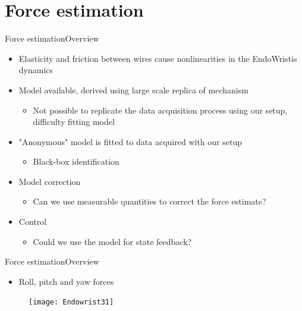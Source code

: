 \section{Force estimation}

\begin{frame}{Force estimation}{Overview}
\begin{itemize}
\item Elasticity and friction between wires cause nonlinearities in the EndoWristis dynamics
\item Model available, derived using large scale replica of mechanism
	\begin{itemize}
		\item Not possible to replicate the data acquisition process using our setup, difficulty fitting model
	\end{itemize}
	
\item "Anonymous" model is fitted to data acquired with our setup
	\begin{itemize}
		\item Black-box identification
	\end{itemize}

\item Model correction
	\begin{itemize}
		\item Can we use measurable quantities to correct the force estimate?
	\end{itemize}

\item Control
	\begin{itemize}
		\item Could we use the model for state feedback?
	\end{itemize}
\end{itemize}
\end{frame}

\begin{frame}{Force estimation}{Overview}
\begin{itemize}
  	\item Roll, pitch and yaw forces
\end{itemize}
 \begin{figure}[h]
 \centering
 \texttt{[image: Endowrist31]}
 \label{fig:ewr}
 \end{figure}
\end{frame}

